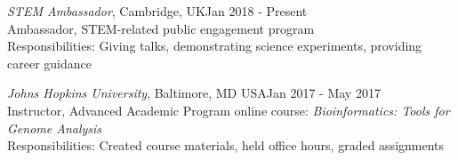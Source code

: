 \documentclass[margin,line]{res}
\begin{document}
\begin{resume}
{\em STEM Ambassador}, Cambridge, UK\hfill {Jan 2018 - Present}\\
Ambassador, STEM-related public engagement program\\
Responsibilities: Giving talks, demonstrating science experiments, providing career guidance

{\em Johns Hopkins University}, Baltimore, MD USA\hfill {Jan 2017 - May 2017}\\
Instructor, Advanced Academic Program online course: {\em Bioinformatics: Tools for Genome Analysis}\\
Responsibilities: Created course materials, held office hours, graded assignments






\end{resume}
\end{document}

